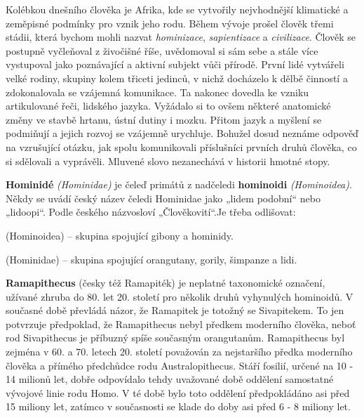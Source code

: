         Kolébkou dnešního člověka je Afrika, kde se vytvořily nejvhodnější klimatické a zeměpisné
        podmínky pro vznik jeho rodu. Během vývoje prošel člověk třemi stádii, která bychom mohli
        nazvat \emph{hominizace}, \emph{sapientizace} a \emph{civilizace}. Člověk se postupně
        vyčleňoval z živočišné říše, uvědomoval si sám sebe a stále více vystupoval jako poznávající
        a aktivní subjekt vůči přírodě. První lidé vytvářeli velké rodiny, skupiny kolem třiceti
        jedinců, v nichž docházelo k dělbě činností a zdokonalovala se vzájemná komunikace. Ta
        nakonec dovedla ke vzniku artikulované řeči, lidského jazyka. Vyžádalo si to ovšem některé
        anatomické změny ve stavbě hrtanu, ústní dutiny i mozku. Přitom jazyk a myšlení se podmiňují
        a jejich rozvoj se vzájemně urychluje. Bohužel dosud neznáme odpověď na vzrušující otázku,
        jak spolu komunikovali příslušníci prvních druhů člověka, co si sdělovali a vyprávěli.
        Mluvené slovo nezanechává v historii hmotné stopy.

        \begin{tcnote}
          \textbf{Hominidé} \emph{(Hominidae)} je čeleď primátů z nadčeledi \textbf{hominoidi}
          \emph{(Hominoidea)}. Někdy se uvádí český název čeledi Hominidae jako „lidem podobní“ nebo
          „lidoopi“. Podle českého názvosloví „Člověkovití“.Je třeba odlišovat:
          \begin{description}[leftmargin=8em,labelindent=1em, style=nextline]
            \item[\textbf{Hominoidi}] (Hominoidea) – skupina spojující gibony a hominidy.
            \item[\textbf{Hominidé}] (Hominidae) – skupina spojující orangutany, gorily, šimpanze a
              lidi.
          \end{description}

          \noindent\textbf{Ramapithecus} (česky též Ramapiték) je neplatné taxonomické označení,
          užívané zhruba do 80. let 20. století pro několik druhů vyhynulých hominoidů. V současné
          době převládá názor, že Ramapitek je totožný se Sivapitekem. To jen potvrzuje předpoklad,
          že Ramapithecus nebyl předkem moderního člověka, neboť rod Sivapithecus je příbuzný spíše
          současným orangutanům. Ramapithecus byl zejména v 60. a 70. letech 20. století považován
          za nejstaršího předka moderního člověka a přímého předchůdce rodu Australopithecus. Stáří
          fosilií, určené na 10 - 14 milionů let, dobře odpovídalo tehdy uvažované době oddělení
          samostatné vývojové linie rodu Homo. V té době bylo toto oddělení předpokládáno asi před
          15 miliony let, zatímco v současnosti se klade do doby asi před 6 - 8 miliony let.
        \end{tcnote}

